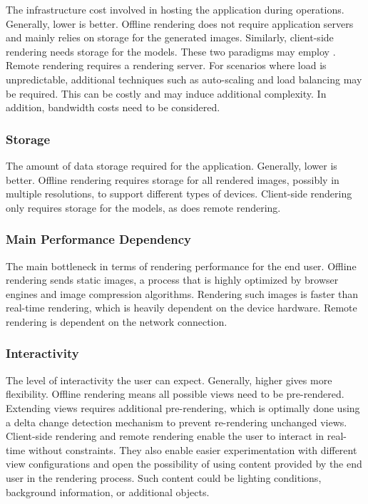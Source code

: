 The infrastructure cost involved in hosting the application during operations. Generally, lower is better. Offline rendering does not require application servers and mainly relies on storage for the generated images. Similarly, client-side rendering needs storage for the models. These two paradigms may employ . Remote rendering requires a rendering server. For scenarios where load is unpredictable, additional techniques such as auto-scaling and load balancing may be required. This can be costly and may induce additional complexity. In addition, bandwidth costs need to be considered.

\subsubsection{Storage}

The amount of data storage required for the application. Generally, lower is better. Offline rendering requires storage for all rendered images, possibly in multiple resolutions, to support different types of devices. Client-side rendering only requires storage for the models, as does remote rendering.

\subsubsection{Main Performance Dependency}

The main bottleneck in terms of rendering performance for the end user. Offline rendering sends static images, a process that is highly optimized by browser engines and image compression algorithms. Rendering such images is faster than real-time rendering, which is heavily dependent on the device hardware. Remote rendering is dependent on the network connection.

\subsubsection{Interactivity}

The level of interactivity the user can expect. Generally, higher gives more flexibility. Offline rendering means all possible views need to be pre-rendered. Extending views requires additional pre-rendering, which is optimally done using a delta change detection mechanism to prevent re-rendering unchanged views. Client-side rendering and remote rendering enable the user to interact in real-time without constraints. They also enable easier experimentation with different view configurations and open the possibility of using content provided by the end user in the rendering process. Such content could be lighting conditions, background information, or additional objects.

